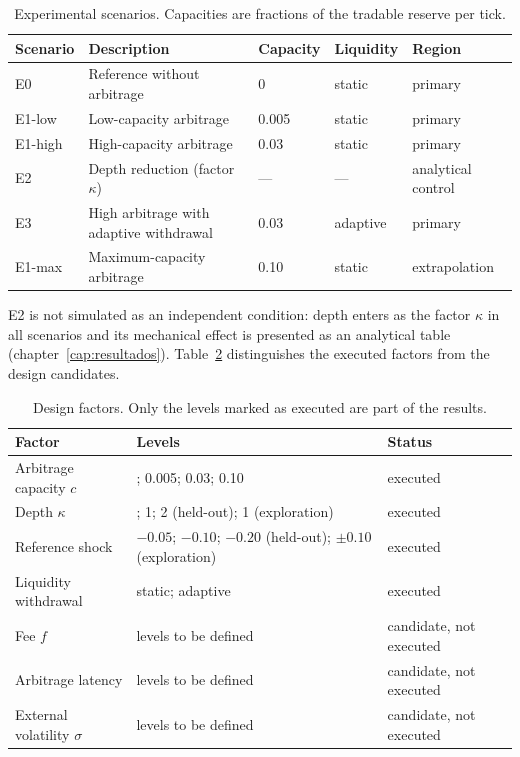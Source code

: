 \begin{table}[htbp]
\centering
\caption{Experimental scenarios. Capacities are fractions of the tradable reserve per tick.}
\label{tab:escenarios}
\small
\begin{tabularx}{\textwidth}{@{}l >{\raggedright\arraybackslash}X l l l@{}}
\toprule
Scenario & Description & Capacity & Liquidity & Region \\
\midrule
E0 & Reference without arbitrage & 0 & static & primary \\
E1-low & Low-capacity arbitrage & 0.005 & static & primary \\
E1-high & High-capacity arbitrage & 0.03 & static & primary \\
E2 & Depth reduction (factor $\kappa$) & --- & --- & analytical control \\
E3 & High arbitrage with adaptive withdrawal & 0.03 & adaptive & primary \\
E1-max & Maximum-capacity arbitrage & 0.10 & static & extrapolation \\
\bottomrule
\end{tabularx}
\end{table}

E2 is not simulated as an independent condition: depth enters as the factor $\kappa$ in all scenarios and its mechanical effect is presented as an analytical table (chapter~\ref{cap:resultados}). Table~\ref{tab:factores} distinguishes the executed factors from the design candidates.

\begin{table}[htbp]
\centering
\caption{Design factors. Only the levels marked as executed are part of the results.}
\label{tab:factores}
\scriptsize
\setlength{\tabcolsep}{3pt}
\renewcommand{\arraystretch}{0.9}
\begin{tabularx}{\textwidth}{@{}>{\raggedright\arraybackslash}p{} >{\raggedright\arraybackslash}X >{\raggedright\arraybackslash}p{}@{}}
\toprule
Factor & Levels & Status \\
\midrule
Arbitrage capacity $c$ & 0; 0.005; 0.03; 0.10 & executed \\
Depth $\kappa$ & 0.5; 1; 2 (held-out); 1 (exploration) & executed \\
Reference shock & $-0.05$; $-0.10$; $-0.20$ (held-out); $\pm0.10$ (exploration) & executed \\
Liquidity withdrawal & static; adaptive & executed \\
Fee $f$ & levels to be defined & candidate, not executed \\
Arbitrage latency & levels to be defined & candidate, not executed \\
External volatility $\sigma$ & levels to be defined & candidate, not executed \\
\bottomrule
\end{tabularx}
\end{table}


